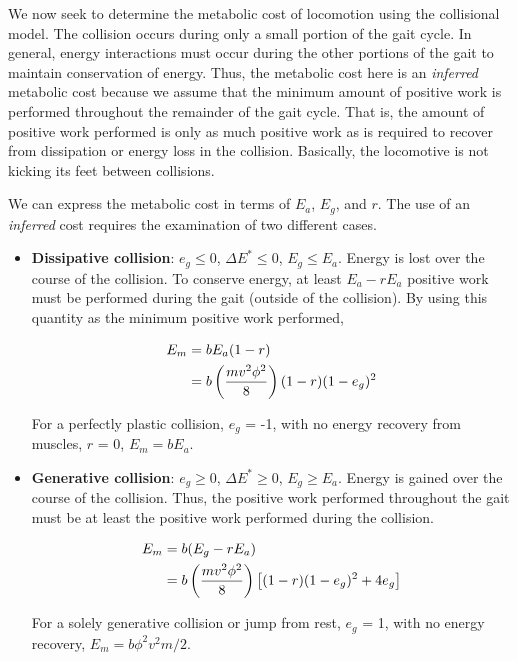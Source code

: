 We now seek to determine the metabolic cost of locomotion using the collisional model. The collision occurs during only a small portion of the gait cycle. In general, energy interactions must occur during the other portions of the gait to maintain conservation of energy. Thus, the metabolic cost here is an \textit{inferred} metabolic cost  because we assume that the minimum amount of positive work is performed throughout the remainder of the gait cycle. That is, the amount of positive work performed is only as much positive work as is required to recover from dissipation or energy loss in the collision. Basically, the locomotive is not kicking its feet between collisions.

We can express the metabolic cost in terms of $E_{a}$, $E_{g}$, and $r$. The use of an \textit{inferred} cost requires the examination of two different cases.

\begin{itemize}
\item \textbf{Dissipative collision}: $e_{g} \leq 0$, $\Delta E^* \leq 0$, $E_{g} \leq E_{a}$. Energy is lost over the course of the collision. To conserve energy, at least $E_a - rE_a$ positive work must be performed during the gait (outside of the collision). By using this quantity as the minimum positive work performed,

\begin{align}
E_{m}& = bE_{a}(1-r) \notag \\
 &= b\left(\frac{m v^{2} \phi^{2}}{8}\right)(1-r)(1-e_{g})^2
\label{eq:MetabolicCostCollisionalNeg}
\end{align}

For a perfectly plastic collision, $e_g$ = -1, with no energy recovery from muscles, $r$ = 0, $E_{m} = b E_{a}$.

\item \textbf{Generative collision}: $e_{g} \geq 0$, $\Delta E^* \geq 0$, $E_{g} \geq E_{a}$. Energy is gained over the course of the collision. Thus, the positive work performed throughout the gait must be at least the positive work performed during the collision.

\begin{align}
E_{m} &= b(E_{g} - r E_{a}) \notag \\
 &= b\left(\frac{m v^{2} \phi^{2}}{8}\right)\left[(1-r)(1-e_{g})^2 + 4e_{g}\right]
\label{eq:MetabolicCostCollisionalPos}
\end{align}

For a solely generative collision or jump from rest, $e_{g}$ = 1, with no energy recovery, $E_{m} = b \phi^2 v^2 m / 2$.
\end{itemize}

